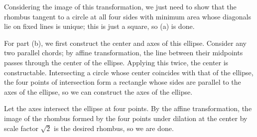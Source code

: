 Considering the image of this transformation, we just need to show that the rhombus tangent to a circle at all four sides with minimum area whose diagonals lie on fixed lines is unique; this is just a square, so (a) is done.

For part (b), we first construct the center and axes of this ellipse. Consider any two parallel chords; by affine transformation, the line between their midpoints passes through the center of the ellipse. Applying this twice, the center is constructable. Intersecting a circle whose center coincides with that of the ellipse, the four points of intersection form a rectangle whose sides are parallel to the axes of the ellipse, so we can construct the axes of the ellipse.

Let the axes intersect the ellipse at four points. By the affine transformation, the image of the rhombus formed by the four points under dilation at the center by scale factor $\sqrt2$ is the desired rhombus, so we are done.
